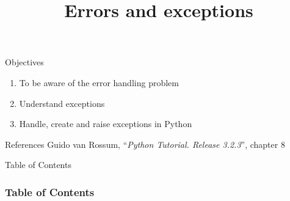 \documentclass[10pt,compress]{beamer} %
\title[Errors and exceptions]{Errors and exceptions}
\author{}
\institute{\asignatura}
\date{}
\begin{document}
{\titlepageBlue
    \begin{frame}
        \titlepage
    \end{frame}
}

\begin{frame}[plain]{}
	\begin{block}{Objectives}
		\begin{enumerate}
		\item To be aware of the error handling problem
		\item Understand exceptions
		\item Handle, create and raise exceptions in Python
		\end{enumerate}
	\end{block}

	\begin{block}{References}
		Guido van Rossum, ``\textit{Python Tutorial. Release 3.2.3}'', chapter 8
	\end{block}
\end{frame}

{
\eliminarNavegacion
\begin{frame}[shrink]{Table of Contents}
 \frametitle{Table of Contents}
 \tableofcontents
\end{frame}
}
\end{document}
